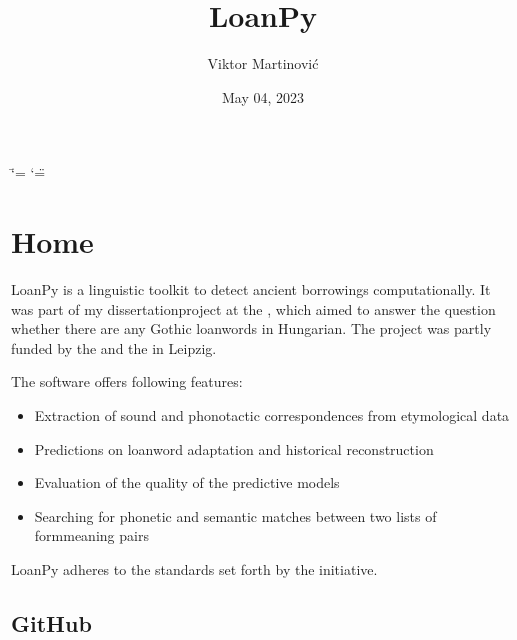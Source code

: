 \documentclass[letterpaper,10pt,english]{sphinxmanual}
\title{LoanPy}
\date{May 04, 2023}
\author{Viktor Martinović}
\begin{document}
\ifdefined\shorthandoff
  \ifnum\catcode`\=\string=\active\shorthandoff{=}\fi
  \ifnum\catcode`\"=\active{}\fi
\fi

\pagestyle{empty}
\sphinxmaketitle
\pagestyle{plain}
\sphinxtableofcontents
\pagestyle{normal}
\label{\detokenize{index::doc}}


\sphinxstepscope


\chapter{Home}
\label{\detokenize{home:home}}\label{\detokenize{home::doc}}
\noindent{}

\sphinxAtStartPar
LoanPy is a linguistic toolkit to detect ancient borrowings computationally.
It was part of my dissertation\sphinxhyphen{}project at the ,
which aimed to answer the question whether there are any Gothic loanwords
in Hungarian. The project was partly funded by the
and the  in Leipzig.

\sphinxAtStartPar
The software offers following features:
\begin{itemize}
\item {} 
\sphinxAtStartPar
Extraction of sound and phonotactic correspondences from etymological data

\item {} 
\sphinxAtStartPar
Predictions on loanword adaptation and historical reconstruction

\item {} 
\sphinxAtStartPar
Evaluation of the quality of the predictive models

\item {} 
\sphinxAtStartPar
Searching for phonetic and semantic matches between two lists of
form\sphinxhyphen{}meaning pairs

\end{itemize}

\sphinxAtStartPar
LoanPy adheres to the standards set forth by the  initiative.


\section{GitHub}
\label{\detokenize{home:github}}
\sphinxAtStartPar
{}
\end{document}
